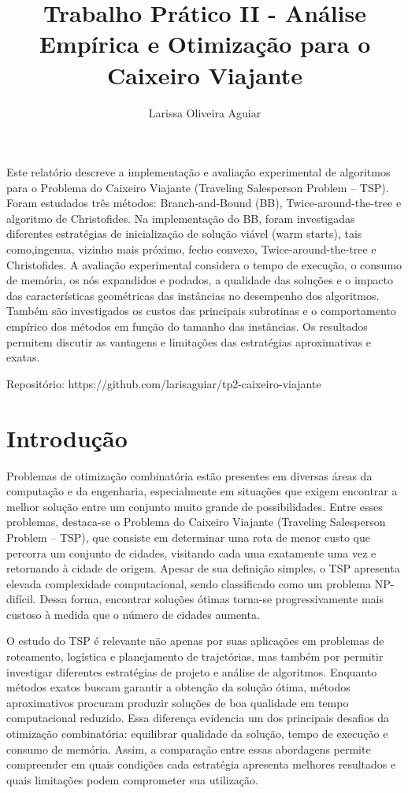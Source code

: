 \documentclass[12pt]{article}
\title{Trabalho Prático II - Análise Empírica e Otimização para o Caixeiro Viajante}
\author{Larissa Oliveira Aguiar\inst{1}}
\begin{document}
 
	
	\maketitle
	
	\begin{resumo} 
        Este relatório descreve a implementação e avaliação experimental de algoritmos para o Problema do Caixeiro Viajante (Traveling Salesperson Problem – TSP). Foram estudados três métodos: Branch-and-Bound (BB), Twice-around-the-tree e algoritmo de Christofides. Na implementação do BB, foram investigadas diferentes estratégias de inicialização de solução viável (warm starts), tais como,ingenua, vizinho mais próximo, fecho convexo, Twice-around-the-tree e Christofides.  A avaliação experimental considera o tempo de execução, o consumo de memória, os nós expandidos e podados, a qualidade das soluções e o impacto das características geométricas das instâncias no desempenho dos algoritmos. Também são investigados os custos das principais subrotinas e o comportamento empírico dos métodos em função do tamanho das instâncias. Os resultados permitem discutir as vantagens e limitações das estratégias aproximativas e exatas.
	\end{resumo}
	 Repositório: https://github.com/larisaguiar/tp2-caixeiro-viajante
     
	\section{Introdução}
	\label{sec_introducao}	
    Problemas de otimização combinatória estão presentes em diversas áreas da computação e da engenharia, especialmente em situações que exigem encontrar a melhor solução entre um conjunto muito grande de possibilidades. Entre esses problemas, destaca-se o Problema do Caixeiro Viajante (Traveling Salesperson Problem – TSP), que consiste em determinar uma rota de menor custo que percorra um conjunto de cidades, visitando cada uma exatamente uma vez e retornando à cidade de origem. Apesar de sua definição simples, o TSP apresenta elevada complexidade computacional, sendo classificado como um problema NP-difícil. Dessa forma, encontrar soluções ótimas torna-se progressivamente mais custoso à medida que o número de cidades aumenta.

O estudo do TSP é relevante não apenas por suas aplicações em problemas de roteamento, logística e planejamento de trajetórias, mas também por permitir investigar diferentes estratégias de projeto e análise de algoritmos. Enquanto métodos exatos buscam garantir a obtenção da solução ótima, métodos aproximativos procuram produzir soluções de boa qualidade em tempo computacional reduzido. Essa diferença evidencia um dos principais desafios da otimização combinatória: equilibrar qualidade da solução, tempo de execução e consumo de memória. Assim, a comparação entre essas abordagens permite compreender em quais condições cada estratégia apresenta melhores resultados e quais limitações podem comprometer sua utilização.
\end{document}
